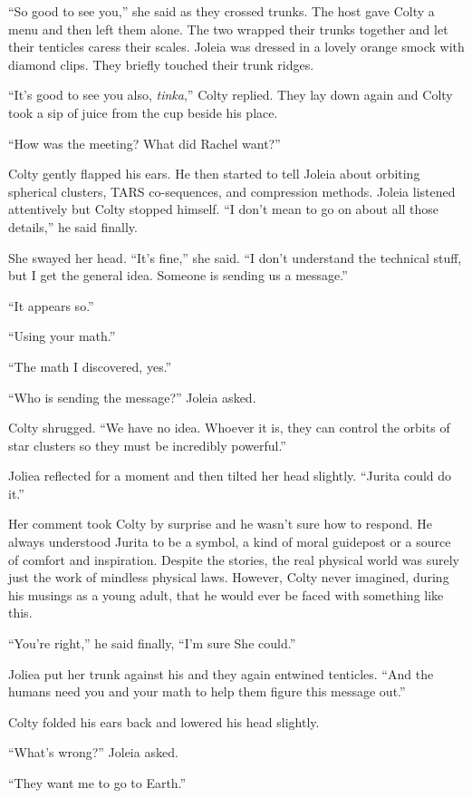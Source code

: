 ``So good to see you,'' she said as they crossed trunks. The host gave Colty a menu and then
left them alone. The two wrapped their trunks together and let their tenticles caress their
scales. Joleia was dressed in a lovely orange smock with diamond clips. They briefly touched
their trunk ridges.

``It's good to see you also, \textit{tinka},'' Colty replied. They lay down again and Colty took
a sip of juice from the cup beside his place.

``How was the meeting? What did Rachel want?''

Colty gently flapped his ears. He then started to tell Joleia about orbiting spherical clusters,
TARS co-sequences, and compression methods. Joleia listened attentively but Colty stopped
himself. ``I don't mean to go on about all those details,'' he said finally.

She swayed her head. ``It's fine,'' she said. ``I don't understand the technical stuff, but I
get the general idea. Someone is sending us a message.''

``It appears so.''

``Using your math.''

``The math I discovered, yes.''

``Who is sending the message?'' Joleia asked.

Colty shrugged. ``We have no idea. Whoever it is, they can control the orbits of star clusters
so they must be incredibly powerful.''

Joliea reflected for a moment and then tilted her head slightly. ``Jurita could do it.''

Her comment took Colty by surprise and he wasn't sure how to respond. He always understood
Jurita to be a symbol, a kind of moral guidepost or a source of comfort and inspiration. Despite
the stories, the real physical world was surely just the work of mindless physical laws.
However, Colty never imagined, during his musings as a young adult, that he would ever be faced
with something like this.

``You're right,'' he said finally, ``I'm sure She could.''

Joliea put her trunk against his and they again entwined tenticles. ``And the humans need you
and your math to help them figure this message out.''

Colty folded his ears back and lowered his head slightly.

``What's wrong?'' Joleia asked.

``They want me to go to Earth.''

